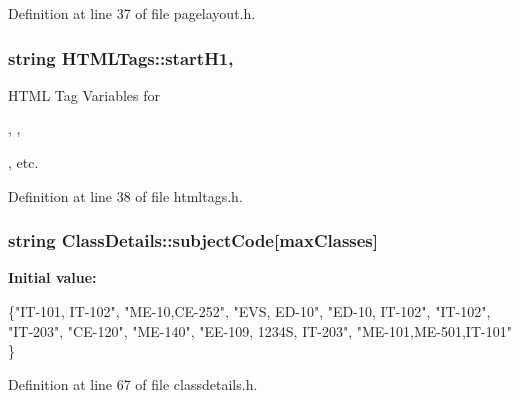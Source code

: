 Definition at line 37 of file pagelayout.\-h.

\hypertarget{classHTMLTags_ae987289d0dab2e3e234048615f930d0f}{
\subsubsection[{start\-H1}]{\setlength{\rightskip}{0pt plus 5cm}string H\-T\-M\-L\-Tags\-::start\-H1\hspace{0.3cm}{\ttfamily [protected]}, {\ttfamily [inherited]}}}\label{classHTMLTags_ae987289d0dab2e3e234048615f930d0f}


H\-T\-M\-L Tag Variables for 

, , 

, etc. 



Definition at line 38 of file htmltags.\-h.

\hypertarget{classClassDetails_aabb81b0797930602510f4531c875c6d1}{
\subsubsection[{subject\-Code}]{\setlength{\rightskip}{0pt plus 5cm}string Class\-Details\-::subject\-Code\mbox{[}max\-Classes\mbox{]}\hspace{0.3cm}{\ttfamily [protected]}}}\label{classClassDetails_aabb81b0797930602510f4531c875c6d1}
{\bfseries Initial value\-:}
\begin{DoxyCode}
 \{\textcolor{stringliteral}{"IT-101, IT-102"}, 
                                          \textcolor{stringliteral}{"ME-10,CE-252"}, \textcolor{stringliteral}{"EVS, ED-10"}, 
                                          \textcolor{stringliteral}{"ED-10, IT-102"}, \textcolor{stringliteral}{"IT-102"}, 
                                          \textcolor{stringliteral}{"IT-203"}, \textcolor{stringliteral}{"CE-120"}, \textcolor{stringliteral}{"ME-140"}, 
                                          \textcolor{stringliteral}{"EE-109, 1234S, IT-203"},    
                                          \textcolor{stringliteral}{"ME-101,ME-501,IT-101"} \}
\end{DoxyCode}


Definition at line 67 of file classdetails.\-h.

